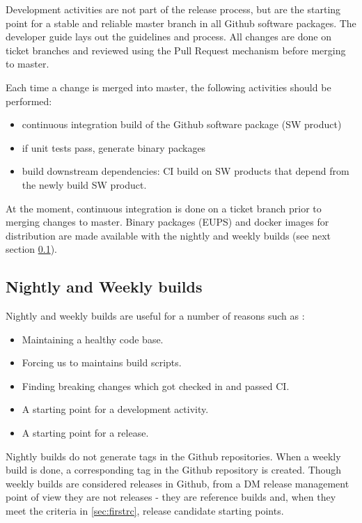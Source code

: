 Development activities are not part of the release process, but are the starting point for a stable and reliable master branch in all Github software packages.
The  developer guide lays out the guidelines and process. All changes are done on ticket branches and reviewed using the Pull Request mechanism before merging to master.

Each time a change is merged into master, the following activities should be performed:

\begin{itemize}
\item continuous integration build of the Github software package (SW product)
\item if unit tests pass, generate binary packages
\item build downstream dependencies: CI build on SW products that depend from the newly build SW product.
\end{itemize}

At the moment, continuous integration is done on a ticket branch prior to merging changes to master. Binary packages (EUPS) and docker images for distribution are made available with the nightly and weekly builds (see next section \ref{sec:weekly}).


\subsection{Nightly and Weekly builds} \label{sec:weekly}

Nightly and weekly builds are  useful for a number of reasons such as :
\begin{itemize}
	\item Maintaining a healthy code base.
	\item Forcing us to maintains build scripts.
	\item Finding breaking changes which got checked in and passed CI.
	\item A starting point for a development activity.
	\item A starting point for a release.
\end{itemize}

Nightly builds do not generate tags in the Github repositories.
When a weekly build is done, a corresponding tag in the Github repository is created.
Though weekly builds are considered releases in Github, from a DM release management point of view they are not
releases - they are reference builds and, when they meet the criteria in \ref{sec:firstrc}, release candidate starting points.


